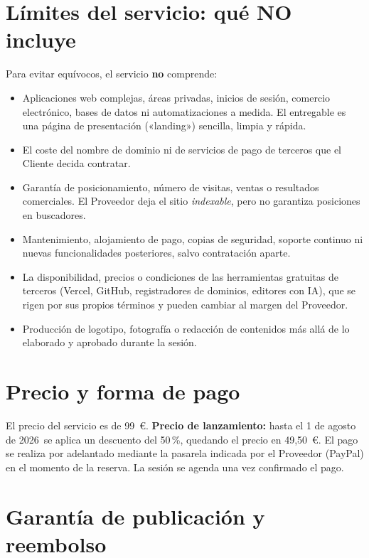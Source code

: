 \documentclass[11pt,a4paper]{article}
\newcommand{\precioBase}{99~\euro}              %
\newcommand{\precioLanz}{49,50~\euro}           %
\newcommand{\lanzHasta}{1 de agosto de 2026}    %
\begin{document}
\section{Límites del servicio: qué NO incluye}

Para evitar equívocos, el servicio \textbf{no} comprende:
\begin{itemize}
  \item Aplicaciones web complejas, áreas privadas, inicios de sesión, comercio
        electrónico, bases de datos ni automatizaciones a medida. El entregable es
        una página de presentación («landing») sencilla, limpia y rápida.
  \item El coste del nombre de dominio ni de servicios de pago de terceros que el
        Cliente decida contratar.
  \item Garantía de posicionamiento, número de visitas, ventas o resultados
        comerciales. El Proveedor deja el sitio \emph{indexable}, pero no garantiza
        posiciones en buscadores.
  \item Mantenimiento, alojamiento de pago, copias de seguridad, soporte continuo
        ni nuevas funcionalidades posteriores, salvo contratación aparte.
  \item La disponibilidad, precios o condiciones de las herramientas gratuitas de
        terceros (Vercel, GitHub, registradores de dominios, editores con IA), que
        se rigen por sus propios términos y pueden cambiar al margen del Proveedor.
  \item Producción de logotipo, fotografía o redacción de contenidos más allá de lo
        elaborado y aprobado durante la sesión.
\end{itemize}

\section{Precio y forma de pago}

El precio del servicio es de \precioBase. \textbf{Precio de lanzamiento:} hasta el
\lanzHasta\ se aplica un descuento del 50\,\%, quedando el precio en
\precioLanz. El pago se realiza por adelantado mediante la pasarela indicada por el
Proveedor (PayPal) en el momento de la reserva. La sesión se agenda una vez
confirmado el pago.

\section{Garantía de publicación y reembolso}
\end{document}
